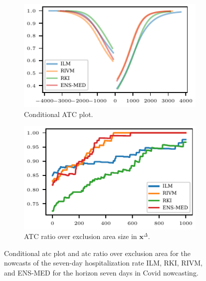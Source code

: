 \documentclass[pdflatex]{sn-jnl}
\theoremstyle{plain}%
\theoremstyle{definition}
\newcommand{\diffx}{\mathbf{x}^{\Delta}}
\begin{document}
\begin{figure}
    \centering
    \begin{subfigure}[t]{.48\textwidth}
    \includegraphics{plots/covid_nowcast/40_cond_prob_lag_7}
    \caption{Conditional ATC plot.}\label{fig:app-covid-cond-prob-7}
    \end{subfigure}\hfill
    \begin{subfigure}[t]{.48\textwidth}
    \includegraphics{plots/covid_nowcast/40_acc_eps_lag_7}
    \caption{ATC ratio over exclusion area size in $\diffx$.}\label{fig:app-covid-atc-ratio-7}
    \end{subfigure}
    \caption[Conditional ATC plot and ATC ratio over exclusion area for the Covid nowcasts.]{Conditional \ac{atc} plot and \ac{atc} ratio over exclusion area for the nowcasts of the seven-day hospitalization rate ILM, RKI, RIVM, and ENS-MED for the horizon seven days in Covid nowcasting.}
    \label{fig:app-covid-cond-prob-atc-ratio-7}
\end{figure}
\end{document}

